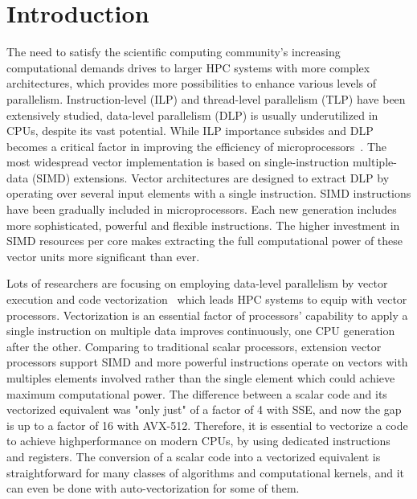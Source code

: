 \documentclass[sigconf]{acmart}
\begin{document}
\section{Introduction}\label{sec:intro}
The need to satisfy the scientific computing community's increasing
computational demands drives to larger HPC systems with more complex architectures,
which provides more possibilities to enhance various levels of parallelism.
%
Instruction-level (ILP) and thread-level parallelism (TLP) have been extensively
studied, data-level parallelism (DLP) is usually underutilized in CPUs, despite its vast potential.
While ILP importance subsides and DLP becomes a critical
factor in improving the efficiency of
microprocessors~\cite{energy_effects, AVX_extensions, Hardware_Events, espasa1998vector, Watson1972TheTA, cluster_efficiency}.
The most widespread vector implementation is based on single-instruction multiple-data (SIMD) extensions.
Vector architectures are designed to extract DLP by operating over several input elements with a single instruction.
SIMD instructions have been gradually included in
microprocessors. Each new generation includes more sophisticated, powerful and flexible
instructions. The higher investment in SIMD resources per core makes extracting the
full computational power of these vector units more significant than ever.

Lots of researchers are focusing on employing data-level parallelism by vector
execution and code vectorization~\cite{Vectorizing_Compilers1,Vectorizing-Compilers,vectorize_11,vectorizingcompilers,SIMD_Vector_Operations} which leads HPC
systems to equip with vector processors.
Vectorization is an essential factor of processors' capability to apply
a single instruction on multiple data improves
continuously, one CPU generation after the other.
Comparing to traditional scalar processors, extension vector processors support
SIMD and more powerful instructions operate
on vectors with multiples elements involved rather than the single element which
could achieve maximum computational power.
The difference between a scalar code and its vectorized equivalent
was "only just" of a factor of 4 with SSE, and now the
gap is up to a factor of 16 with AVX-512. Therefore, it is essential to
vectorize a code to achieve highperformance on modern CPUs, by using dedicated instructions
and registers. The conversion of a scalar code into a vectorized
equivalent is straightforward for many classes of algorithms
and computational kernels, and it can even be done with auto-vectorization for some of them.
%
\end{document}
